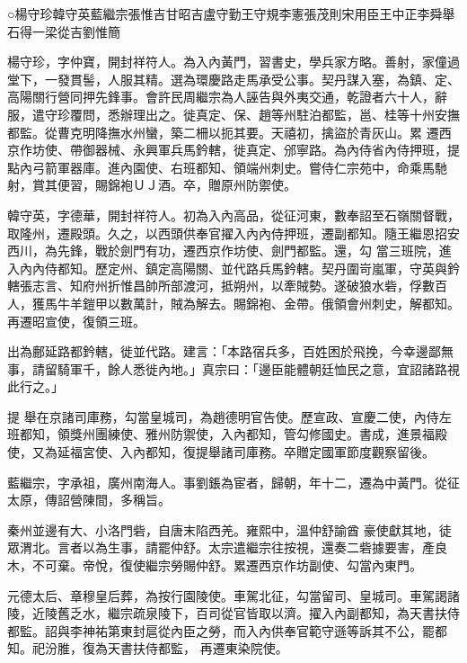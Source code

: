 
\begin{pinyinscope}

 ○楊守珍韓守英藍繼宗張惟吉甘昭吉盧守勤王守規李憲張茂則宋用臣王中正李舜舉
 石得一梁從吉劉惟簡



 楊守珍，字仲寶，開封祥符人。為入內黃門，習書史，學兵家方略。善射，家僮過堂下，一發貫髻，人服其精。選為環慶路走馬承受公事。契丹謀入塞，為鎮、定、高陽關行營同押先鋒事。會許民周繼宗為人誣告與外夷交通，乾證者六十人，辭服，遣守珍覆問，悉辦理出之。徙真定、保、趙等州駐泊都監，邕、桂等十州安撫都監。從曹克明降撫水州蠻，築二柵以扼其要。天禧初，擒盜於青灰山。累
 遷西京作坊使、帶御器械、永興軍兵馬鈐轄，徙真定、邠寧路。為內侍省內侍押班，提點內弓箭軍器庫。進內園使、右班都知、領端州刺史。嘗侍仁宗苑中，命乘馬馳射，賞其便習，賜錦袍ＵＪ酒。卒，贈原州防禦使。



 韓守英，字德華，開封祥符人。初為入內高品，從征河東，數奉詔至石嶺關督戰，取隆州，遷殿頭。久之，以西頭供奉官擢入內內侍押班，遷副都知。隨王繼恩招安西川，為先鋒，戰於劍門有功，遷西京作坊使、劍門都監。還，勾
 當三班院，進入內內侍都知。歷定州、鎮定高陽關、並代路兵馬鈐轄。契丹圍岢嵐軍，守英與鈐轄張志言、知府州折惟昌帥所部渡河，抵朔州，以牽賊勢。遂破狼水砦，俘數百人，獲馬牛羊鎧甲以數萬計，賊為解去。賜錦袍、金帶。俄領會州刺史，解都知。再遷昭宣使，復領三班。



 出為鄜延路都鈐轄，徙並代路。建言：「本路宿兵多，百姓困於飛挽，今幸邊鄙無事，請留騎軍千，餘人悉徙內地。」真宗曰：「邊臣能體朝廷恤民之意，宜詔諸路視此行之。」



 提
 舉在京諸司庫務，勾當皇城司，為趙德明官告使。歷宣政、宣慶二使，內侍左班都知，領獎州團練使、雅州防禦使，入內都知，管勾修國史。書成，進景福殿使，又為延福宮使、入內都知，復提舉諸司庫務。卒贈定國軍節度觀察留後。



 藍繼宗，字承祖，廣州南海人。事劉鋹為宦者，歸朝，年十二，遷為中黃門。從征太原，傳詔營陳間，多稱旨。



 秦州並邊有大、小洛門砦，自唐末陷西羌。雍熙中，溫仲舒諭酋
 豪使獻其地，徒眾渭北。言者以為生事，請罷仲舒。太宗遣繼宗往按視，還奏二砦據要害，產良木，不可棄。帝悅，復使繼宗勞賜仲舒。累遷西京作坊副使、勾當內東門。



 元德太后、章穆皇后葬，為按行園陵使。車駕北征，勾當留司、皇城司。車駕謁諸陵，近陵舊乏水，繼宗疏泉陵下，百司從官皆取以濟。擢入內副都知，為天書扶侍都監。詔與李神祐第東封扈從內臣之勞，而入內供奉官範守遜等訴其不公，罷都知。祀汾脽，復為天書扶侍都監，
 再遷東染院使。




\end{pinyinscope}
